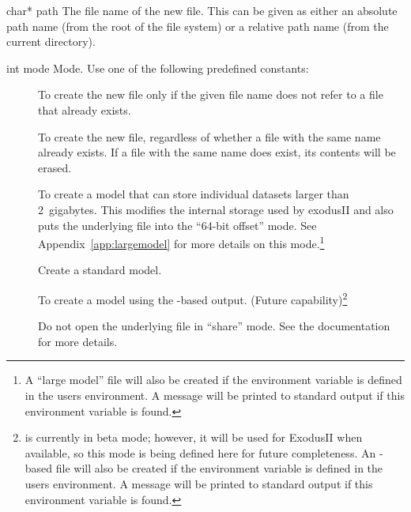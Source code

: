 \begin{parameters}
\item[{char* path \R{}}]
The file name of the new \exo{} file. This can be given as either an
absolute path name (from the root of the file system) or a relative
path name (from the current directory).


\item[{int mode \R{}}]
Mode. Use one of the following predefined constants:

\begin{description}
\item[] 
To create the new file only if the given file name does not refer to a
file that already exists.

\item[] 
To create the new file, regardless of whether a file with the same
name already exists. If a file with the same name does exist, its
contents will be erased.

\item[] 
To create a model that can store individual datasets larger than
2~gigabytes. This modifies the internal storage used by exodusII and
also puts the underlying  file into the ``64-bit offset''
mode. See Appendix~\ref{app:largemodel} for more details on this
mode.\footnote{A ``large model'' file will also be created if the
environment variable
 is defined
in the users environment. A message will be printed to standard output
if this environment variable is found.}

\item[] 
Create a standard model.

\item[] 
To create a model using the -based 
output. (Future capability)\footnote{ is currently in
beta mode; however, it will be used for ExodusII when available, so
this mode is being defined here for future completeness. An
-based  file will also be created if the
environment variable  is defined in the
users environment. A message will be printed to standard output if
this environment variable is found.}

\item[] 
Do not open the underlying  file in ``share'' mode. See the
 documentation for more details.


\end{description}
\end{parameters}
